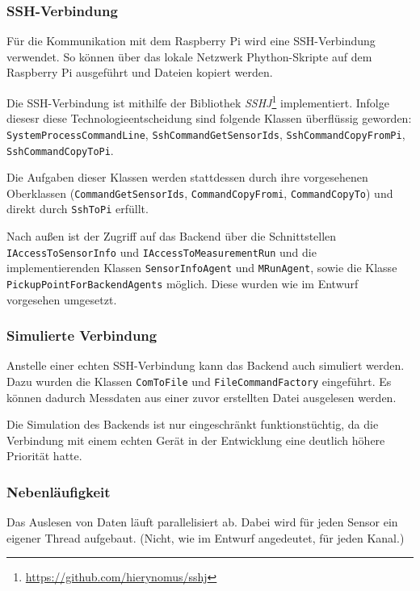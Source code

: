 \documentclass[parskip=full]{scrartcl}
\begin{document}
\subsubsection{SSH-Verbindung}

Für die Kommunikation mit dem Raspberry Pi wird eine SSH-Verbindung verwendet. So können über das lokale Netzwerk Phython-Skripte auf dem Raspberry Pi ausgeführt und Dateien kopiert werden.

Die SSH-Verbindung ist mithilfe der Bibliothek \textit{SSHJ}\footnote{\url{https://github.com/hierynomus/sshj}} implementiert. Infolge diesesr diese Technologieentscheidung sind folgende Klassen überflüssig geworden: \verb:SystemProcessCommandLine:, \verb:SshCommandGetSensorIds:, \verb:SshCommandCopyFromPi:, \verb:SshCommandCopyToPi:.

Die Aufgaben dieser Klassen werden stattdessen durch ihre vorgesehenen Oberklassen (\verb:CommandGetSensorIds:, \verb:CommandCopyFromi:, \verb:CommandCopyTo:) und direkt durch \verb:SshToPi: erfüllt.

Nach außen ist der Zugriff auf das Backend über die Schnittstellen \verb:IAccessToSensorInfo: und \verb:IAccessToMeasurementRun: und die implementierenden Klassen \verb:SensorInfoAgent: und \verb:MRunAgent:, sowie die Klasse \verb:PickupPointForBackendAgents: möglich. Diese wurden wie im Entwurf vorgesehen umgesetzt.

\subsubsection{Simulierte Verbindung}

Anstelle einer echten SSH-Verbindung kann das Backend auch simuliert werden. Dazu wurden die Klassen \verb:ComToFile: und \verb:FileCommandFactory: eingeführt. Es können dadurch Messdaten aus einer zuvor erstellten Datei ausgelesen werden.

Die Simulation des Backends ist nur eingeschränkt funktionstüchtig, da die Verbindung mit einem echten Gerät in der Entwicklung eine deutlich höhere Priorität hatte.

\subsubsection{Nebenläufigkeit}

Das Auslesen von Daten läuft parallelisiert ab. Dabei wird für jeden Sensor ein eigener Thread aufgebaut. (Nicht, wie im Entwurf angedeutet, für jeden Kanal.)
\end{document}
